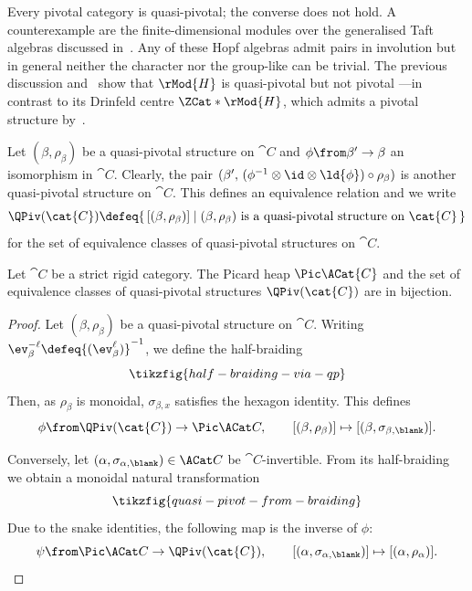 \begin{remark}\label{rem: quasi_pivotal_vs_pivotal}
  Every pivotal category is quasi-pivotal; the converse does not hold.
  A counterexample are the finite\hyp{}dimensional modules over the generalised Taft algebras discussed in~\cite{Halbig2018}.
  Any of these Hopf algebras admit pairs in involution but in general neither the character nor the group-like can be trivial.
  The previous discussion and~\cite[Lemma~5.6]{Halbig2019} show that \(\rMod{H}\) is quasi-pivotal but not pivotal%
  —in contrast to its Drinfeld centre \(\ZCat*{\rMod{H}}\),
  which admits a pivotal structure by~\cite[Lemma~5.5]{Halbig2019}.
\end{remark}

Let \((\beta, \rho_\beta)\) be a quasi-pivotal structure on \(\cat{C}\) and \(\phi \from \beta' \to \beta\) an isomorphism in \(\cat{C}\).
Clearly, the pair \((\beta',\,(\phi^{-1}\otimes \id \otimes \ld{\phi}) \circ \rho_\beta)\) is another quasi-pivotal structure on \(\cat{C}\).
This defines an equivalence relation and we write
\[
  \QPiv (\cat{C}) \defeq \{\, [(\beta, \rho_\beta)] \mid (\beta, \rho_\beta) \text{ is a quasi-pivotal structure on } \cat{C} \,\}
\]
for the set of equivalence classes of quasi-pivotal structures on \(\cat{C}\).

\begin{lemma}\label{lem: quasi_piv_vs_inv_ayds}
  Let \(\cat{C}\) be a strict rigid category.
  The Picard heap \(\Pic \ACat{C}\) and the set of equivalence classes of quasi-pivotal structures \(\QPiv (\cat{C})\) are in bijection.
\end{lemma}
\begin{proof}
  Let \((\beta, \rho_\beta)\) be a quasi-pivotal structure on \(\cat{C}\).
  Writing \(\ev^{-\ell}_{\beta} \defeq {(\ev^\ell_{\beta})}^{-1}\),
  we define the half-braiding
  \[
    \tikzfig{half-braiding-via-qp}
  \]
  Then, as \(\rho_{\beta}\) is monoidal, \(\sigma_{\beta,x}\) satisfies the hexagon identity.
  This defines
  \[
    \phi \from \QPiv (\cat{C}) \to \Pic \ACat C, \qquad
    [(\beta, \rho_\beta)] \mapsto [(\beta, \sigma_{\beta, \blank})].
  \]

  Conversely, let \((\alpha, \sigma_{\alpha,\blank}) \in \ACat C\) be \(\cat{C}\)\hyp{}invertible.
  From its half-braiding we obtain a monoidal natural transformation
  \[
    \tikzfig{quasi-pivot-from-braiding}
  \]
  Due to the snake identities, the following map is the inverse of \(\phi\):
  \[
    \psi \from \Pic \ACat C \to \QPiv (\cat{C}), \qquad
    [(\alpha, \sigma_{\alpha, \blank})] \mapsto [(\alpha, \rho_\alpha)].\qedhere
  \]
\end{proof}

